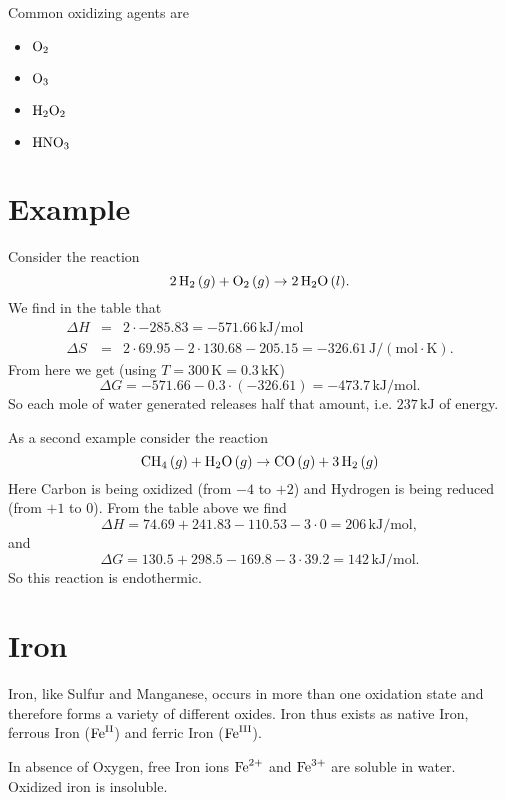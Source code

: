 \documentclass[a4paper,14pt]{extarticle}
\def\H{{\rm H}}
\def\O{{\rm O}}
\def\N{{\rm N}}
\def\C{{\rm C}}
\def\Fe{{\rm Fe}}
\def\II{{\rm II}}
\def\III{{\rm III}}
\begin{document}
Common oxidizing agents are
\begin{itemize}
    \item $\O_2$
    \item $\O_3$
    \item $\H_2\O_2$
    \item $\H\N\O_3$
\end{itemize}


\section{Example}

Consider the reaction
\[
    2 \,\H_2 \,(g) + \O_2 \,(g) \rightarrow 2 \,\H_2\O \,(l).
\]
We find in the table that
\[
    \begin{array}{rcl}
        \Delta H &=& 2 \cdot -285.83 = -571.66 \,\text{kJ}/\text{mol} \\
        \Delta S &=& 2 \cdot 69.95 - 2 \cdot 130.68 - 205.15 = -326.61 \,\text{J}/(\text{mol}\cdot \text{K}).
    \end{array}
\]
From here we get (using $T = 300 \,\text{K} = 0.3 \,\text{kK}$)
\[
    \Delta G = -571.66 - 0.3 \cdot (-326.61) = -473.7 \,\text{kJ}/\text{mol}.
\]
So each mole of water generated releases half that amount, i.e. $237 \,\text{kJ}$ of energy.

As a second example consider the reaction
\[
    \C\H_4 \,(g)+ \H_2\O \,(g)\rightarrow \C\O \,(g)+ 3\,\H_2\,(g)
\]
Here Carbon is being oxidized (from $-4$ to $+2$) and Hydrogen is being reduced (from $+1$ to $0$).
From the table above we find
\[
    \Delta H = 74.69 + 241.83 - 110.53 - 3\cdot 0 = 206 \,\text{kJ}/\text{mol},
\]
and
\[
    \Delta G = 130.5 + 298.5 - 169.8 - 3\cdot 39.2 = 142 \,\text{kJ}/\text{mol}.
\]
So this reaction is endothermic.


\section{Iron}
Iron, like Sulfur and Manganese, occurs in more than one oxidation state and therefore forms a variety of different
oxides.  Iron thus exists as native Iron, ferrous Iron ($\Fe^{\II}$) and ferric Iron ($\Fe^{\III}$).

In absence of Oxygen, free Iron ions $\Fe^{2+}$ and $\Fe^{3+}$ are soluble in water. Oxidized iron is insoluble.
\end{document}
